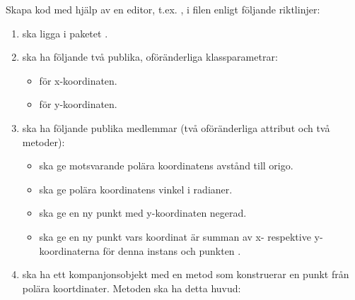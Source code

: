\Subtask Skapa kod med hjälp av en editor, t.ex. , i filen   enligt följande riktlinjer:
\begin{enumerate}[noitemsep]
\item {} ska ligga i paketet .

\item {} ska ha följande två publika, oföränderliga klassparametrar:
\begin{itemize}[nolistsep, noitemsep]
\item {} för x-koordinaten.
\item {} för y-koordinaten.
\end{itemize}

\item {} ska ha följande publika medlemmar (två oföränderliga attribut och två metoder):
\begin{itemize}[nolistsep, noitemsep]
\item {} ska ge motsvarande polära koordinatens
 avstånd till origo.
\item {} ska ge polära koordinatens vinkel i radianer.
\item {} ska ge en ny punkt med y-koordinaten negerad.
\item {} ska ge en ny punkt vars koordinat är summan av x- respektive y-koordinaterna för denna instans och punkten .
\end{itemize}

\item {} ska ha ett kompanjonsobjekt med en metod som konstruerar en punkt från polära koortdinater. Metoden ska ha detta huvud: \\

\end{enumerate}

